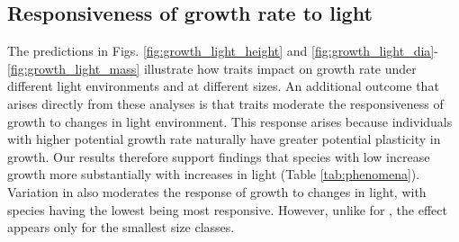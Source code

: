 \documentclass[9pt,twocolumn,twoside,lineno]{pnas-new}
\begin{document}
\subsection{Responsiveness of growth rate to light}

The predictions in Figs. \ref{fig:growth_light_height} and \ref{fig:growth_light_dia}-\ref{fig:growth_light_mass} illustrate how traits impact on growth rate under different light environments and at different sizes. An additional outcome that arises directly from these analyses is that traits moderate the responsiveness of growth to changes in light environment. This response arises because individuals with higher potential growth rate naturally have greater potential plasticity in growth. Our results therefore support findings that species with low {\wood} increase growth more substantially with increases in light (Table \ref{tab:phenomena}). Variation in {\lma} also moderates the response of growth to changes in light, with species having the lowest {\lma} being most responsive. However, unlike for {\wood}, the effect appears only for the smallest size classes.
\end{document}
